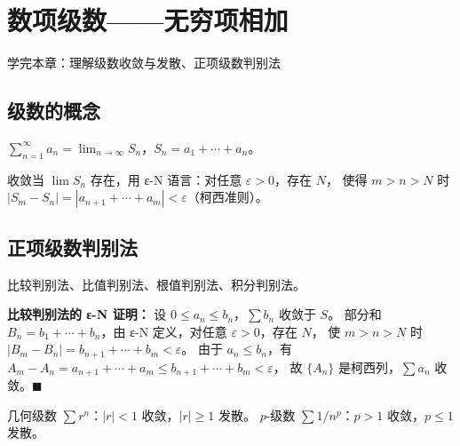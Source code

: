 \chapter{数项级数——无穷项相加}
\begin{applicationbox}
学完本章：理解级数收敛与发散、正项级数判别法
\end{applicationbox}
\section{级数的概念} \(\sum_{n=1}^\infty a_n = \lim_{n\to\infty} S_n\)，\(S_n=a_1+\cdots+a_n\)。

收敛当 \(\lim S_n\) 存在，用 ε-N 语言：对任意 \(\varepsilon>0\)，存在 \(N\)，
使得 \(m>n>N\) 时 \(|S_m - S_n| = |a_{n+1}+\cdots+a_m| < \varepsilon\)（柯西准则）。
\section{正项级数判别法} 比较判别法、比值判别法、根值判别法、积分判别法。

\textbf{比较判别法的 ε-N 证明：} 设 \(0\le a_n\le b_n\)，\(\sum b_n\) 收敛于 \(S\)。
部分和 \(B_n=b_1+\cdots+b_n\)，由 ε-N 定义，对任意 \(\varepsilon>0\)，存在 \(N\)，
使 \(m>n>N\) 时 \(|B_m-B_n|=b_{n+1}+\cdots+b_m<\varepsilon\)。
由于 \(a_n\le b_n\)，有 \(A_m-A_n=a_{n+1}+\cdots+a_m\le b_{n+1}+\cdots+b_m<\varepsilon\)，
故 \(\{A_n\}\) 是柯西列，\(\sum a_n\) 收敛。\(\blacksquare\)
\begin{examplebox}[1] 几何级数 \(\sum r^n\)：\(|r|<1\) 收敛，\(|r|\ge1\) 发散。
\(p\)-级数 \(\sum 1/n^p\)：\(p>1\) 收敛，\(p\le1\) 发散。\end{examplebox}
